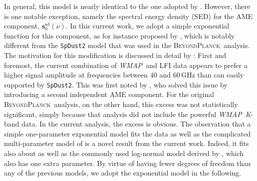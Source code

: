 \documentclass[twocolumn]{../../common/aa}
\def\WMAP{\emph{WMAP}}
\newcommand{\bp}{\textsc{BeyondPlanck}}
\newcommand{\cosmoglobe}{\textsc{Cosmoglobe}}
\newcommand{\K}[0]{\textit K}
\begin{document}
In general, this model is nearly identical to the one adopted by \citet{bp01}. However, there is one notable exception, namely the spectral energy density (SED) for the AME component, $\boldsymbol s_0^\mathrm{sd}(\nu)$. In this current work, we adopt a simple exponential function for this component, as for instance proposed by \citet{hensley:2015}, which is notably different from the \texttt{SpDust2} model \citep{ali-haimoud:2009, ali-haimoud:2010, silsbee:2011} that was used in the \bp\ analysis. The motivation for this modification is discussed in detail by \citet{watts2023_ame}: First and foremost, the current combination of \WMAP\ and LFI data appears to prefer a higher signal amplitude at frequencies between 40 and 60\,GHz than can easily supported by \texttt{SpDust2}. This was first noted by \citet{planck2014-a11}, who solved this issue by introducing a second independent AME component. For the original \bp\ analysis, on the other hand, this excess was not statistically significant, simply because that analysis did not include the powerful \WMAP\ \K-band data. In the current analysis, the excess is obvious. The observation that a simple one-parameter exponential model fits the data as well as the complicated multi-parameter model of \citet{planck2014-a11} is a novel result from the current work. Indeed, it fits also about as well as the commonly used log-normal model derived by \citet{Stevenson_2014}, which also has one extra parameter. By virtue of having fewer degrees of freedom than any of the previous models, we adopt the exponential model in the following.

\end{document}
